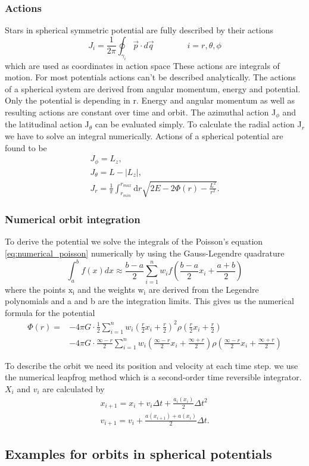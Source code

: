 \subsubsection{Actions}\label{sec:actions}

Stars in spherical symmetric potential are fully described by their actions \begin{equation}
J_i=\frac{1}{2\pi}\oint_{\gamma_i}\vec{p}\cdot d\vec{q} \qquad\qquad i=r,\theta,\phi
\end{equation} which are used as coordinates in action space
These actions are integrals of motion. For most potentials actions can't be described analytically. The actions of a spherical system are derived from angular momentum, energy and potential. Only the potential is depending in r. Energy and angular momentum as well as resulting actions are constant over time and orbit. The azimuthal action J\(_\phi\) and the latitudinal action J\(_\theta\) can be evaluated simply. To calculate the radial action J\(_r\) we have to solve an integral numerically. Actions of a spherical potential are found to be 
\begin{align}\label{eq:actions}
J_\phi=L_z, \\ J_\theta=L-|L_z|, \\ J_r=\frac{1}{\pi} \int_{r_{min}}^{r_{max}} \mathrm{d}r \sqrt{2E-2\Phi(r)-\frac{L^2}{r^2}}. 
\end{align}

\subsubsection{Numerical orbit integration}\label{sec:num_int}
To derive the potential we solve the integrals of the Poisson's equation \eqref{eq:numerical_poisson} numerically by using the Gauss-Legendre quadrature 
\begin{equation}\label{eq:Gauss-Legendre}
\int_a^b f(x)dx \approx \frac{b-a}{2}\sum_{i=1}^n w_i f\left(\frac{b-a}{2}x_i+\frac{a+b}{2}\right)
\end{equation} where the points \(\mathrm{x_i}\) and the weights \(\mathrm{w_i}\) are derived from the Legendre polynomials and a and b are the integration limits. This gives us the numerical formula for the potential 
\begin{equation}\label{eq:numerical_potential}
\begin{aligned}
\Phi(r)= & -4\pi G \cdot \frac{1}{2}\sum_{i=1}^n  w_i\left(\frac{r}{2}x_i+\frac{r}{2}\right)^2\rho\left(\frac{r}{2} x_i+ \frac{r}{2}\right) \\
&-4\pi G\cdot\frac{\infty-r}{2}\sum_{i=1}^n w_i\left(\frac{\infty-r}{2} x_i +\frac{\infty+r}{2}\right)\rho\left(\frac{\infty-r}{2} x_i +\frac{\infty+r}{2}\right)
\end{aligned}
\end{equation}
\par To describe the orbit we need its position and velocity at each time step. we use the numerical leapfrog method which is a second-order time reversible integrator. \(X_i\) and \(v_i\) are calculated by 
\begin{align}
x_{i+1}=x_i+v_i\Delta t+\frac{a_i(x_i)}{2}\Delta t^2 \\
v_{i+1}=v_i+\frac{a(x_{i+1})+a(x_i)}{2}\Delta t.
\end{align}
\subsection{Examples for orbits in spherical potentials}\label{sec:orbit_examples}
